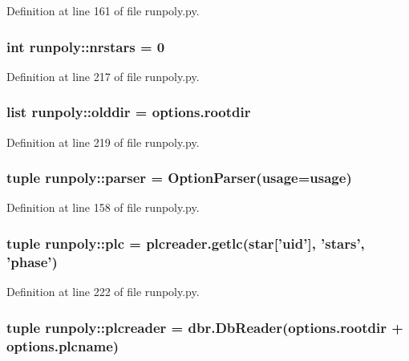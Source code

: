 Definition at line 161 of file runpoly.py.

\hypertarget{namespacerunpoly_aa86a45877f78f52e3357c19a9221feed}{
\subsubsection[{nrstars}]{\setlength{\rightskip}{0pt plus 5cm}int {\bf runpoly::nrstars} = 0}}
\label{namespacerunpoly_aa86a45877f78f52e3357c19a9221feed}


Definition at line 217 of file runpoly.py.

\hypertarget{namespacerunpoly_a429eb81cafed3ca14e2465cbd91d3224}{
\subsubsection[{olddir}]{\setlength{\rightskip}{0pt plus 5cm}list {\bf runpoly::olddir} = options.rootdir}}
\label{namespacerunpoly_a429eb81cafed3ca14e2465cbd91d3224}


Definition at line 219 of file runpoly.py.

\hypertarget{namespacerunpoly_a366967b50d48b6d7ab51bb4bd156ff40}{
\subsubsection[{parser}]{\setlength{\rightskip}{0pt plus 5cm}tuple {\bf runpoly::parser} = OptionParser({\bf usage}={\bf usage})}}
\label{namespacerunpoly_a366967b50d48b6d7ab51bb4bd156ff40}


Definition at line 158 of file runpoly.py.

\hypertarget{namespacerunpoly_a079d0116a1dcdb50fd810307fa37f4b4}{
\subsubsection[{plc}]{\setlength{\rightskip}{0pt plus 5cm}tuple {\bf runpoly::plc} = plcreader.getlc(star\mbox{[}'uid'\mbox{]}, 'stars', 'phase')}}
\label{namespacerunpoly_a079d0116a1dcdb50fd810307fa37f4b4}


Definition at line 222 of file runpoly.py.

\hypertarget{namespacerunpoly_afb96306fccc8888ba0c85e13ab7a5598}{
\subsubsection[{plcreader}]{\setlength{\rightskip}{0pt plus 5cm}tuple {\bf runpoly::plcreader} = dbr.DbReader(options.rootdir + options.plcname)}}
\label{namespacerunpoly_afb96306fccc8888ba0c85e13ab7a5598}



